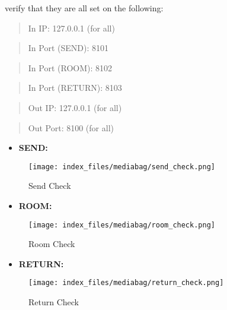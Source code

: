 \documentclass[
  letterpaper,
  DIV=11,
  numbers=noendperiod]{scrreport}
\providecommand{\tightlist}{%
  \setlength{\itemsep}{0pt}\setlength{\parskip}{0pt}}\usepackage{longtable,booktabs,array}
\begin{document}
verify that they are all set on the following:

\begin{quote}
In IP: 127.0.0.1 (for all)
\end{quote}

\begin{quote}
In Port (SEND): 8101
\end{quote}

\begin{quote}
In Port (ROOM): 8102
\end{quote}

\begin{quote}
In Port (RETURN): 8103
\end{quote}

\begin{quote}
Out IP: 127.0.0.1 (for all)
\end{quote}

\begin{quote}
Out Port: 8100 (for all)
\end{quote}

\begin{itemize}
\tightlist
\item
  \textbf{SEND:}
\end{itemize}

\begin{figure}

{\centering \texttt{[image: index\_files/mediabag/send\_check.png]}

}

\caption{Send Check}

\end{figure}

\begin{itemize}
\tightlist
\item
  \textbf{ROOM:}
\end{itemize}

\begin{figure}

{\centering \texttt{[image: index\_files/mediabag/room\_check.png]}

}

\caption{Room Check}

\end{figure}

\begin{itemize}
\tightlist
\item
  \textbf{RETURN:}
\end{itemize}

\begin{figure}

{\centering \texttt{[image: index\_files/mediabag/return\_check.png]}

}

\caption{Return Check}

\end{figure}
\end{document}
